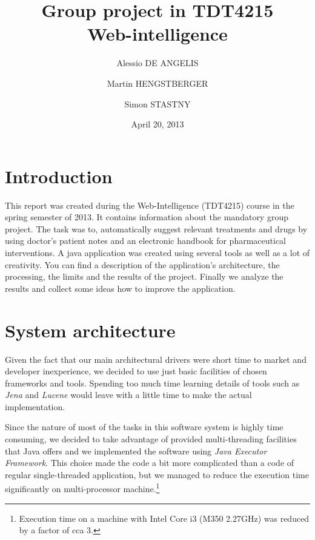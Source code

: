 \documentclass{article}
\begin{document}
\title{Group project in TDT4215\\
Web-intelligence}

\date{April 20, 2013}

\author{
  Alessio DE ANGELIS\and 
  Martin HENGSTBERGER\and
  Simon STASTNY}

\maketitle

\tableofcontents
\newpage


\section{Introduction}

This report was created during the Web-Intelligence (TDT4215) course in the spring semester of 2013. It contains information about the mandatory group project. The task was to, automatically suggest relevant treatments and drugs by using doctor's patient notes and an electronic handbook for pharmaceutical interventions. A java application was created using several tools as well as a lot of creativity. You can find a description of the application's architecture, the processing, the limits and the results of the project. Finally we analyze the results and collect some ideas how to improve the application.

\section{System architecture}

Given the fact that our main architectural drivers were short time to market and developer inexperience, we decided to use just basic facilities of chosen frameworks and tools. Spending too much time learning details of tools such as \emph{Jena} and \emph{Lucene} would leave with a little time to make the actual implementation.

Since the nature of most of the tasks in this software system is highly time consuming, we decided to take advantage of provided multi-threading facilities that Java offers and we implemented the software using \emph{Java Executor Framework}. This choice made the code a bit more complicated than a code of regular single-threaded application, but we managed to reduce the execution time significantly on multi-processor machine.\footnote{Execution time on a machine with Intel Core i3 (M350 2.27GHz) was reduced by a factor of cca 3.}
\end{document}
